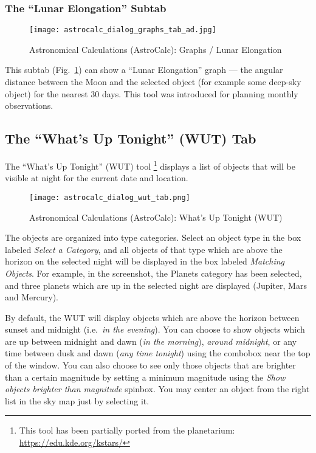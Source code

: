\subsubsection{The ``Lunar Elongation'' Subtab}
\label{sec:gui:AstroCalc:Graphs:LE}

\begin{figure}[tbp]
\centering\texttt{[image: astrocalc\_dialog\_graphs\_tab\_ad.jpg]}
\caption{Astronomical Calculations (AstroCalc): Graphs / Lunar Elongation}
\label{fig:gui:AstroCalc:Graphs:LE}
\end{figure}

This subtab (Fig.~\ref{fig:gui:AstroCalc:Graphs:LE})
 can show a ``Lunar Elongation''
graph --- the angular distance between the Moon
and the selected object (for example some deep-sky object) for the
nearest 30 days. This tool was introduced for planning monthly
observations.

\subsection{The ``What's Up Tonight'' (WUT) Tab}
\label{sec:gui:AstroCalc:WUT}

The ``What's Up Tonight'' (WUT) tool%
	\footnote{This tool has been partially ported from the  planetarium: \url{https://edu.kde.org/kstars/}}
 displays a list of objects that will be visible at night for the current date and location.

\begin{figure}[tbp]
\centering\texttt{[image: astrocalc\_dialog\_wut\_tab.png]}
\caption{Astronomical Calculations (AstroCalc): What's Up Tonight (WUT)}
\label{fig:gui:AstroCalc:WUT}
\end{figure}

The objects are organized into type categories. Select an object type in the box labeled 
\emph{Select a Category}, and all objects of that type which are above the horizon on the selected night 
will be displayed in the box labeled \emph{Matching Objects}. For example, in the screenshot, 
the Planets category has been selected, and three planets which are up in the selected night are displayed (Jupiter, Mars and Mercury). 

By default, the WUT will display objects which are above the horizon between sunset and midnight (i.e.\ \emph{in the evening}). 
You can choose to show objects which are up between midnight and dawn (\emph{in the morning}), 
\emph{around midnight}, 
or any time between dusk and dawn (\emph{any time tonight}) using the combobox near the top of the window. 
You can also choose to see only those objects that are brighter than a certain magnitude by 
setting a minimum magnitude using the \emph{Show objects brighter than magnitude} spinbox. 
You may center an object from the right list in the sky map just by selecting it.


